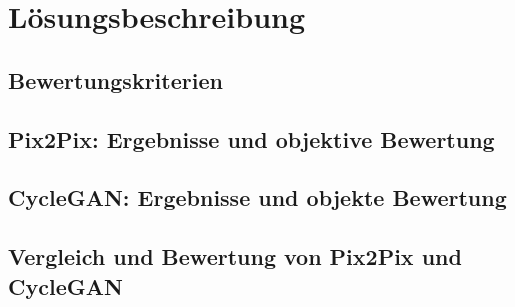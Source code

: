\chapter{Lösungsbeschreibung}
\section{Bewertungskriterien}
\section{Pix2Pix: Ergebnisse und objektive Bewertung}
\section{CycleGAN: Ergebnisse und objekte Bewertung}
\section{Vergleich und Bewertung von Pix2Pix und CycleGAN}

